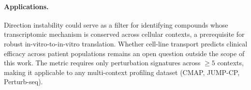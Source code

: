 \documentclass{article}
\begin{document}
\paragraph{Applications.}
Direction instability could serve as a filter for identifying compounds
whose transcriptomic mechanism is conserved across cellular contexts,
a prerequisite for robust in-vitro-to-in-vitro translation. Whether
cell-line transport predicts clinical efficacy across patient populations
remains an open question outside the scope of this work. The metric
requires only perturbation signatures across $\geq5$ contexts, making
it applicable to any multi-context profiling dataset (CMAP, JUMP-CP,
Perturb-seq).



\end{document}
